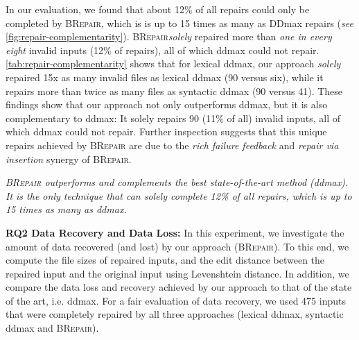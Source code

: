 \documentclass[sigconf,review,anonymous]{acmart}
\newenvironment{result}{\begin{framed}\centering\it}{\end{framed}}
\newcounter{todocounter}
\newcommand{\todo}[1]{\marginpar{$|$}\textcolor{red}{\stepcounter{todocounter}\footnote[\thetodocounter]{\textcolor{red}{\textbf{TODO }}\textit{#1}}}}
\renewcommand{\todo}[1]{}
\newcommand{\approach}{\textsc{BRepair}\xspace}
\begin{document}
In our evaluation, we found that about 12\% of all repairs could only be completed by \approach, which is is up to 15 times as many as DDmax repairs (\textit{see} \autoref{fig:repair-complementarity}). 
\approach \textit{solely} repaired more than 
\textit{one in every eight} invalid inputs (12\% of repairs), %
all of which ddmax could not repair. %
\autoref{tab:repair-complementarity} shows that for lexical ddmax, our approach \textit{solely} repaired 15x as many invalid files as lexical ddmax (90 versus six), while it repairs more than twice as many files as syntactic ddmax (90 versus 41). 
These findings show that our approach not only outperforms ddmax, but it is also complementary to ddmax: It solely repairs 90 (11\% of all) invalid inputs, all of which ddmax could not repair. %
Further 
inspection suggests that this unique repairs achieved by \approach are due to the \textit{rich failure feedback} and \textit{repair via insertion} synergy of \approach. 



\begin{result}
\approach 
outperforms and complements the best state-of-the-art method (ddmax).
It is the only technique that can solely complete 12\% of all repairs, which is up to 15 times as many as ddmax. 
\end{result}

\noindent
\textbf{RQ2 Data Recovery and Data Loss:}\todo{fix discussion of \autoref{tab:data-recovery} } In this experiment, we investigate the amount of data recovered (and lost) by our approach (\approach). To this end, we compute the file sizes of repaired inputs, and the edit distance between the repaired input and the original input using Levenshtein distance. In addition, we compare the data loss and recovery achieved by our approach to that of the state of the art, i.e. ddmax. 
For a fair evaluation of data recovery, we used 475 inputs that were completely repaired by all three approaches (lexical ddmax, syntactic ddmax and \approach). 
\end{document}
